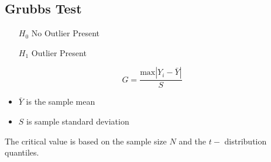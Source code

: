 \subsection{Grubbs Test}

\begin{itemize}
\item[$H_0$] No Outlier Present
\item[$H_1$] Outlier Present
\end{itemize}


\[ G = \frac{\mbox{max}|Y_i-\bar{Y}|}{S} \]

\begin{itemize}
\item $\bar{Y}$ is the sample mean
\item $S$ is sample standard deviation
\end{itemize}

The critical value is based on the sample size $N$ and the $t-$ distribution quantiles.
